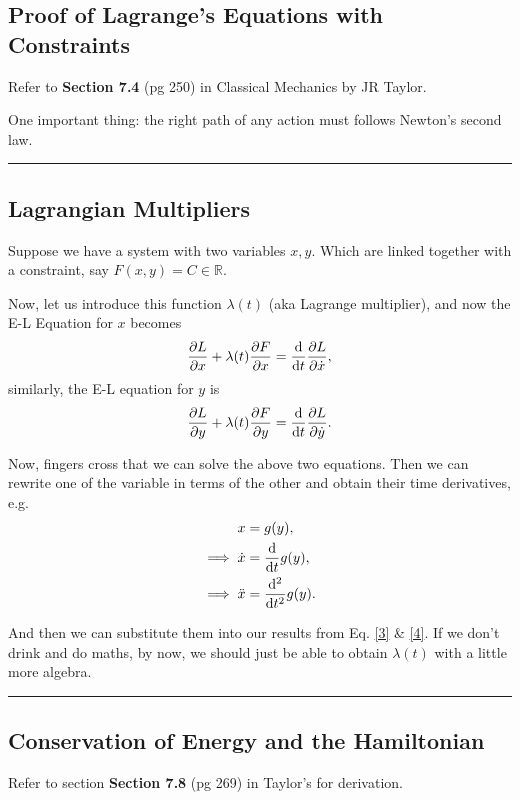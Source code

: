 \documentclass[12pt,english]{article}
\numberwithin{equation}{subsection}
\begin{document}
\subsection{Proof of Lagrange's Equations with Constraints}
Refer to \textbf{Section 7.4} (pg 250) in Classical Mechanics by JR Taylor.

One important thing: the right path of any action must follows Newton's second law.
\par\noindent\rule{\textwidth}{0.4pt}
\subsection{Lagrangian Multipliers}
Suppose we have a system with two variables $x, y$. Which are linked together with a constraint, say $F(x,y) = C \in \mathbb{R}.$ 

Now, let us introduce this function $\lambda(t)$ (aka Lagrange multiplier), and now the E-L Equation for $x$ becomes 
\begin{equation}
    \pdv{L}{x} +\lambda(t)\pdv{F}{x} = \dv{t}\pdv{L}{\dot{x}},\label{3}
\end{equation}
similarly, the E-L equation for $y$ is 
\begin{equation}
    \pdv{L}{y} +\lambda(t)\pdv{F}{y} = \dv{t}\pdv{L}{\dot{y}}.\label{4}
\end{equation}

Now, fingers cross that we can solve the above two equations. Then we can rewrite one of the variable in terms of the other and obtain their time derivatives, e.g.
\begin{align}
    x &= g(y),\\
    \implies \dot{x} &= \dv{t}g(y),\\
    \implies \ddot{x} &= \dv[2]{t}g(y).
\end{align}

And then we can substitute them into our results from Eq. \eqref{3} \& \eqref{4}. If we don't drink and do maths, by now, we should just be able to obtain $\lambda(t)$ with a little more algebra.






\par\noindent\rule{\textwidth}{0.4pt}
\subsection{Conservation of Energy and the Hamiltonian}
Refer to section \textbf{Section 7.8} (pg 269) in Taylor's for derivation.
\end{document}
